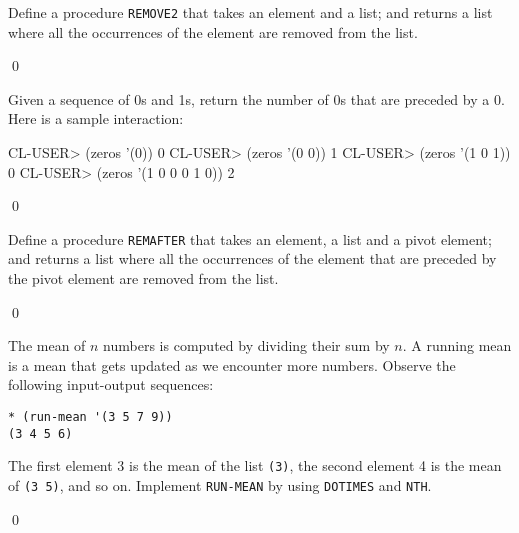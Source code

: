 \documentclass[a4paper,11pt]{article}
\begin{document}
\begin{uexercise}
Define a procedure \Verb+REMOVE2+ that takes an element and a list; and returns a list where all the occurrences of the element are removed from the list.

\qed
\end{uexercise}

\begin{uexercise}[*]
 Given a sequence of 0s and 1s, return the number of 0s that
are preceded by a 0. Here is a sample interaction:

\begin{lispcode}
CL-USER> (zeros '(0))
0
CL-USER> (zeros '(0 0))
1
CL-USER> (zeros '(1 0 1))
0
CL-USER> (zeros '(1 0 0 0 1 0))
2
\end{lispcode}

\qed
\end{uexercise}

\begin{uexercise}
Define a procedure \Verb+REMAFTER+  that takes an element, a list and
a pivot element; and returns a list where all the occurrences of the
element that are preceded by the pivot element are removed from the list.

\qed
\end{uexercise}

% 

\begin{uexercise}
The mean of $n$ numbers is computed by dividing their sum by $n$. A running mean is a mean that gets updated as we encounter more numbers. Observe the following input-output sequences:

\begin{Verbatim}
* (run-mean '(3 5 7 9))
(3 4 5 6)
\end{Verbatim}

The first element 3 is the mean of the list \Verb+(3)+, the second element 4 is the mean of \Verb+(3 5)+, and so on. Implement \Verb+RUN-MEAN+ by using \Verb+DOTIMES+ and \Verb+NTH+.

\qed
\end{uexercise}
\end{document}
